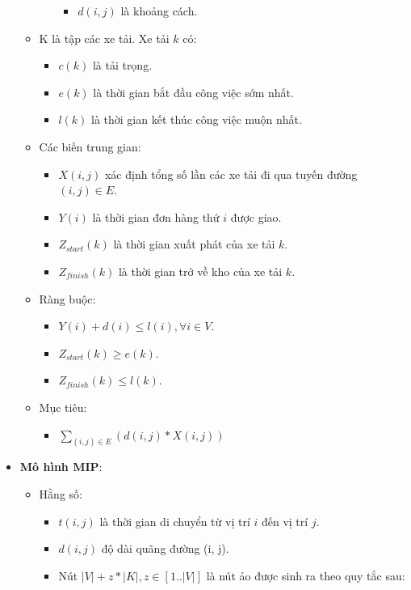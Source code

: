 \documentclass{article}
\begin{document}
\begin{itemize}
\begin{itemize}
\begin{itemize}
\begin{itemize}
				\item $d(i, j)$ là khoảng cách.
			\end{itemize}
		\end{itemize}
		\item K là tập các xe tải. Xe tải $k$ có:
		\begin{itemize}
			\item $c(k)$ là tải trọng.
			\item $e(k)$ là thời gian bắt đầu công việc sớm nhất.
			\item $l(k)$ là thời gian kết thúc công việc muộn nhất.
		\end{itemize}
		\item Các biến trung gian:
		\begin{itemize}
			\item $X(i, j)$ xác định tổng số lần các xe tải đi qua tuyến đường $(i, j) \in E$.
			\item $Y(i)$ là thời gian đơn hàng thứ $i$ được giao.
			\item $Z_{start}(k)$ là thời gian xuất phát của xe tải $k$.
			\item $Z_{finish}(k)$ là thời gian trở về kho của xe tải $k$.
		\end{itemize}
		\item Ràng buộc:
		\begin{itemize}
			\item $Y(i) + d(i) \leq l(i), \forall i \in V$.
			\item $Z_{start}(k) \geq e(k)$.
			\item $Z_{finish}(k) \leq l(k)$.
		\end{itemize}
		\item {Mục tiêu}:
		\begin{itemize}
			\item $\sum_{(i, j) \in E}^{} (d(i, j) * X(i, j))$
		\end{itemize}
	\end{itemize}
	\item \textbf{Mô hình MIP}:
	\begin{itemize}
		\item Hằng số:
		\begin{itemize}
			\item $t(i, j)$ là thời gian di chuyển từ vị trí $i$ đến vị trí $j$.
			\item $d(i, j)$ độ dài quãng đường (i, j).
			\item Nút $|V| + z * |K|, z \in [1.. |V|]$ là nút ảo được sinh ra theo quy tắc sau:
			\begin{itemize}

\end{itemize}
\end{itemize}
\end{itemize}
\end{itemize}
\end{document}
